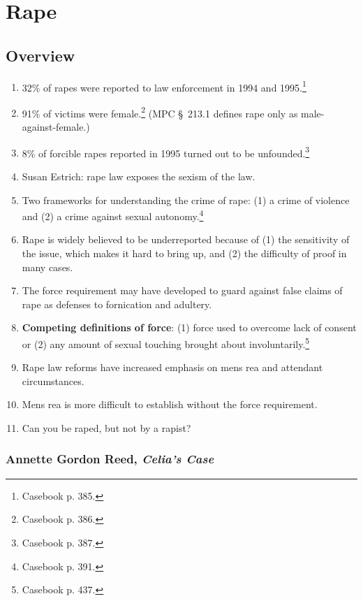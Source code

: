 \section{Rape}

\subsection{Overview}

\begin{enumerate}
    \item 32\% of rapes were reported to law enforcement in 1994 and 
    1995.\footnote{Casebook p. 385.}
    \item 91\% of victims were female.\footnote{Casebook p. 386.} (MPC \S\ 213.1 
    defines rape only as male-against-female.)
    \item 8\% of forcible rapes reported in 1995 turned out to be 
    unfounded.\footnote{Casebook p. 387.}
    \item Susan Estrich: rape law exposes the sexism of the law.
    \item Two frameworks for understanding the crime of rape: (1) a crime of 
    violence and (2) a crime against sexual autonomy.\footnote{Casebook p. 
    391.}
    \item Rape is widely believed to be underreported because of (1) the 
    sensitivity of the issue, which makes it hard to bring up, and (2) the 
    difficulty of proof in many cases.
    \item The force requirement may have developed to guard against false 
    claims of rape as defenses to fornication and adultery.
    \item \textbf{Competing definitions of force}: (1) force used to overcome 
    lack of consent or (2) any amount of sexual touching brought about 
    involuntarily.\footnote{Casebook p. 437.}
    \item Rape law reforms have increased emphasis on mens rea and attendant 
    circumstances.
    \item Mens rea is more difficult to establish without the force 
    requirement.
    \item Can you be raped, but not by a rapist?
\end{enumerate}

\subsubsection{Annette Gordon Reed, \emph{Celia's Case}}

